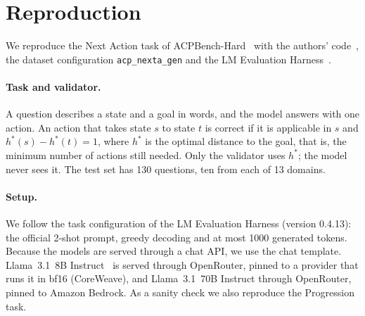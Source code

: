 \section{Reproduction}
\label{sec:reproduction}

We reproduce the Next Action task of ACPBench-Hard~\citep{kokel2025acpbenchhard} with the
authors' code~\citep{acpbench_code}, the dataset configuration \texttt{acp\_nexta\_gen}
\citep{acpbench_data} and the LM Evaluation Harness~\citep{gao2024lmeval}.

\paragraph{Task and validator.}
A question describes a state and a goal in words, and the model answers with one action. An action
that takes state $s$ to state $t$ is correct if it is applicable in $s$ and
$h^*(s)-h^*(t)=1$, where $h^*$ is the optimal distance to the goal, that is, the minimum number of
actions still needed. Only the validator uses $h^*$; the model never sees it. The test set has 130
questions, ten from each of 13 domains.

\paragraph{Setup.}
We follow the task configuration of the LM Evaluation Harness (version 0.4.13): the official
2-shot prompt, greedy decoding and at most 1000 generated tokens. Because the models are served
through a chat API, we use the chat template. Llama~3.1~8B Instruct~\citep{dubey2024llama3} is
served through OpenRouter, pinned to a provider that runs it in bf16 (CoreWeave), and Llama~3.1~70B Instruct through OpenRouter, pinned to Amazon Bedrock. As a sanity check we also reproduce the Progression task.

